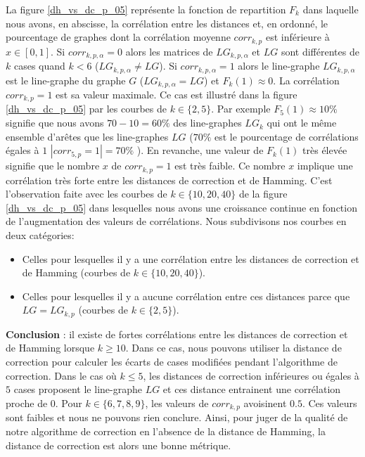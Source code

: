 La figure \ref{dh_vs_dc_p_05} repr\'esente la fonction de repartition $F_k$ dans laquelle nous avons, en abscisse, la corr\'elation entre les distances et, en ordonn\'e, le pourcentage de graphes dont la corr\'elation moyenne $corr_{k,p}$ est inf\'erieure \`a $x \in [0,1]$. 
Si $corr_{k,p,\alpha} = 0$ alors les matrices de $LG_{k,p,\alpha}$ et $LG$ sont diff\'erentes de $k$ cases quand $k < 6$ ($LG_{k,p,\alpha} \neq LG$).
Si $corr_{k,p,\alpha} = 1$ alors le line-graphe $LG_{k, p, \alpha}$ est le line-graphe du graphe $G$ ($LG_{k, p, \alpha} = LG$) et $F_k(1) \approx 0$. 
La corr\'elation $corr_{k,p} = 1$ est sa valeur maximale. 
Ce cas est illustr\'e dans la figure \ref{dh_vs_dc_p_05} par les courbes de $k \in \{2,5\}$. 
Par exemple $F_5(1) \approx 10\%$ signifie que nous avons $70-10=60\%$ des line-graphes $LG_k$ qui ont le m\^eme ensemble d'ar\^etes que les line-graphes $LG$ ($70\%$ est le pourcentage de corr\'elations \'egales \`a $1$ $|corr_{5,p} = 1 | = 70\%$ ).
\newline
En revanche, une valeur de $F_k(1)$ tr\`es \'elev\'ee signifie que le nombre $x$ de  $corr_{k,p} = 1$ est tr\`es faible. Ce nombre $x$ implique une corr\'elation tr\`es forte entre les distances de correction et de Hamming.
C'est l'observation faite avec les courbes de $k \in \{10,20,40\}$ de la figure \ref{dh_vs_dc_p_05} dans lesquelles nous avons une  croissance continue en fonction de l'augmentation des valeurs de corr\'elations.
\newline
Nous subdivisons nos courbes en deux cat\'egories:
\begin{itemize}
	\item Celles pour lesquelles il y a une corr\'elation entre les distances de correction et de Hamming (courbes de $k \in \{10,20,40\}$).
	\item Celles pour lesquelles il y a  aucune corr\'elation entre ces distances parce que   $LG = LG_{k,p}$ (courbes de $k \in \{2,5\}$). 
\end{itemize}


{\bf Conclusion} :
il existe de fortes corr\'elations entre les distances de correction et de Hamming lorsque $k \ge 10$. Dans ce cas, nous pouvons utiliser la distance de correction pour calculer les \'ecarts de cases modifi\'ees pendant l'algorithme de correction.
Dans le cas o\`u $k \le 5$, les distances de correction inf\'erieures ou \'egales \`a $5$ cases proposent le line-graphe $LG$ et ces distance entrainent une corr\'elation proche de $0$.
Pour  $k \in \{6,7,8,9\}$, les valeurs de $corr_{k,p}$ avoisinent $0.5$. Ces valeurs sont faibles et nous ne pouvons rien conclure.
Ainsi, pour juger de la qualit\'e de notre algorithme de correction en l'absence de la distance de Hamming, la distance de correction est alors une bonne m\'etrique.
